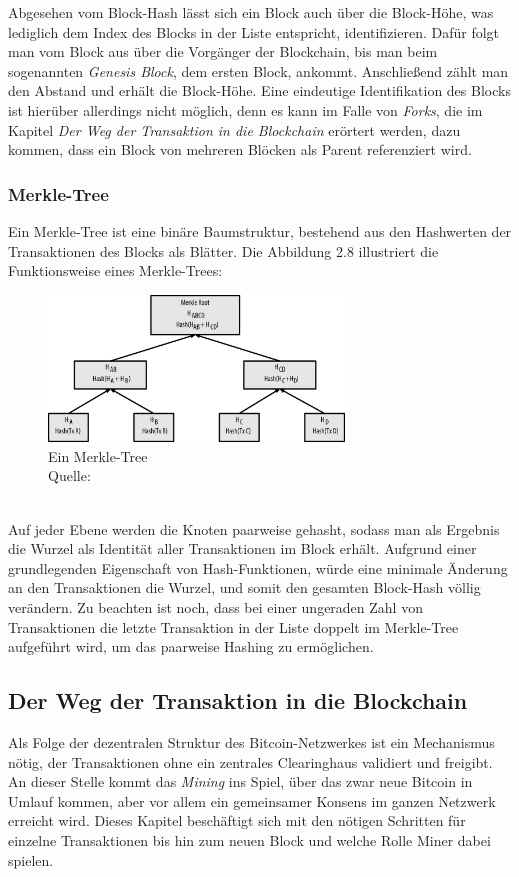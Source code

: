 Abgesehen vom Block-Hash lässt sich ein Block auch über die Block-Höhe, was lediglich dem Index des Blocks in der Liste entspricht, identifizieren. 
Dafür folgt man vom Block aus über die Vorgänger der Blockchain, bis man beim sogenannten \emph{Genesis Block}, dem ersten Block, ankommt. 
Anschließend zählt man den Abstand und erhält die Block-Höhe.
Eine eindeutige Identifikation des Blocks ist hierüber allerdings nicht möglich, denn es kann im Falle von \emph{Forks}, die im Kapitel \emph{Der Weg der Transaktion in die Blockchain} erörtert werden, dazu kommen, dass ein Block von mehreren Blöcken als Parent referenziert wird.\\
\subsubsection{Merkle-Tree}
Ein Merkle-Tree ist eine binäre Baumstruktur, bestehend aus den Hashwerten der Transaktionen des Blocks als Blätter. Die Abbildung 2.8 illustriert die Funktionsweise eines Merkle-Trees:
\begin{figure}[htpb]
	\centering
	\includegraphics[width=0.7\textwidth]{images/merkle.png}
	\caption{Ein Merkle-Tree\\
	Quelle: \cite{antanopoulos_2014}}
	\label{6braun:fig:merkle}
\end{figure}\\
Auf jeder Ebene werden die Knoten paarweise gehasht, sodass man als Ergebnis die Wurzel als Identität aller Transaktionen im Block erhält. 
Aufgrund einer grundlegenden Eigenschaft von Hash-Funktionen, würde eine minimale Änderung an den Transaktionen die Wurzel, und somit den gesamten Block-Hash völlig verändern. 
Zu beachten ist noch, dass bei einer ungeraden Zahl von Transaktionen die letzte Transaktion in der Liste doppelt im Merkle-Tree aufgeführt wird, um das paarweise Hashing zu ermöglichen.
\subsection{Der Weg der Transaktion in die Blockchain}
Als Folge der dezentralen Struktur des Bitcoin-Netzwerkes ist ein Mechanismus nötig, der Transaktionen ohne ein zentrales Clearinghaus validiert und freigibt. An dieser Stelle kommt das \emph{Mining} ins Spiel, über das zwar neue Bitcoin in Umlauf kommen, aber vor allem ein gemeinsamer Konsens im ganzen Netzwerk erreicht wird.
Dieses Kapitel beschäftigt sich mit den nötigen Schritten für einzelne Transaktionen bis hin zum neuen Block und welche Rolle Miner dabei spielen.
